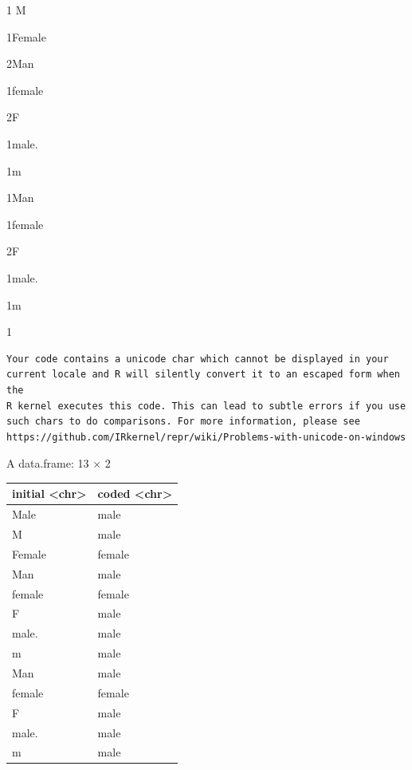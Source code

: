 \documentclass[
  letterpaper,
  DIV=11,
  numbers=noendperiod]{scrreprt}
\newenvironment{Shaded}{\begin{snugshade}}{\end{snugshade}}
\newcommand{\AttributeTok}[1]{\textcolor[rgb]{0.40,0.45,0.13}{#1}}
\newcommand{\CommentTok}[1]{\textcolor[rgb]{0.37,0.37,0.37}{#1}}
\newcommand{\FunctionTok}[1]{\textcolor[rgb]{0.28,0.35,0.67}{#1}}
\newcommand{\NormalTok}[1]{\textcolor[rgb]{0.00,0.23,0.31}{#1}}
\newcommand{\SpecialCharTok}[1]{\textcolor[rgb]{0.37,0.37,0.37}{#1}}
\providecommand{\tightlist}{%
  \setlength{\itemsep}{0pt}\setlength{\parskip}{0pt}}\usepackage{longtable,booktabs,array}
\begin{document}
\begin{description}
\tightlist
\item[Male]
1{ M}

1Female

2Man

1female

2{F }

1male.

1m

1Man

1female

2{F }

1male.

1m

1
\end{description}

\begin{Shaded}
\end{Shaded}

\begin{verbatim}
Your code contains a unicode char which cannot be displayed in your
current locale and R will silently convert it to an escaped form when the
R kernel executes this code. This can lead to subtle errors if you use
such chars to do comparisons. For more information, please see
https://github.com/IRkernel/repr/wiki/Problems-with-unicode-on-windows
\end{verbatim}

A data.frame: 13 × 2

\begin{longtable}[]{@{}ll@{}}
\toprule\noalign{}
initial \textless chr\textgreater{} & coded
\textless chr\textgreater{} \\
\midrule\noalign{}
\endhead
\bottomrule\noalign{}
\endlastfoot
Male & male \\
M & male \\
Female & female \\
Man & male \\
female & female \\
F & male \\
male. & male \\
m & male \\
Man & male \\
female & female \\
F & male \\
male. & male \\
m & male \\
\end{longtable}
\end{document}

